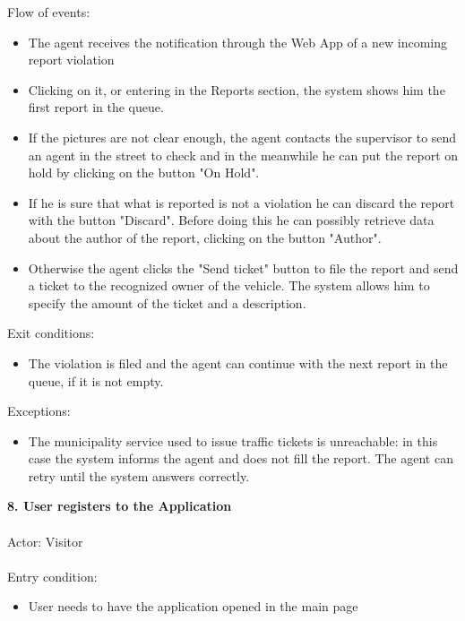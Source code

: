 \documentclass[a4paper]{report}
\begin{document}
Flow of events:
\begin{itemize} 
\item The agent receives the notification through the Web App of a new incoming report violation
\item Clicking on it, or entering in the Reports section, the system shows him the first report in the queue.
\item If the pictures are not clear enough, the agent contacts the supervisor to send an agent in the street to check and in the meanwhile he can put the report on hold by clicking on the button "On Hold".
\item If he is sure that what is reported is not a violation he can discard the report with the button "Discard". Before doing this he can possibly retrieve data about the author of the report, clicking on the button "Author".
\item Otherwise the agent clicks the "Send ticket" button to file the report and send a ticket to the recognized owner of the vehicle. The system allows him to specify the amount of the ticket and a description.
\end{itemize}
Exit conditions:
\begin{itemize}
\item The violation is filed and the agent can continue with the next report in the queue, if it is not empty.
\end{itemize}
Exceptions: 
\begin{itemize}
\item The municipality service used to issue traffic tickets is unreachable: in this case the system informs the agent and does not fill the report. The agent can retry until the system answers correctly.
\end{itemize}
\textbf{8. User registers to the Application}
\\ \\
Actor: Visitor \\ \\
Entry condition: 
\begin{itemize}
\item User needs to have the application opened in the main page
\end{itemize}
\end{document}
